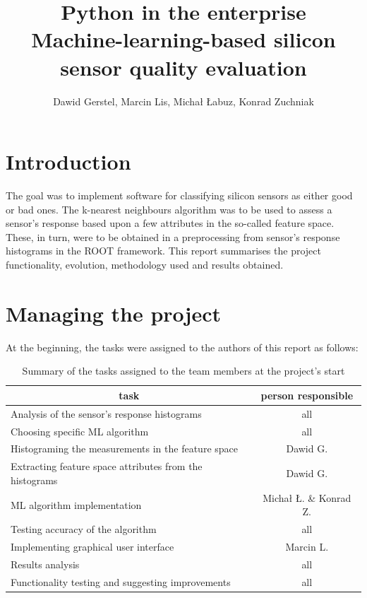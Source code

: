 \documentclass[a4paper,10pt]{article}
\title{\textbf{Python in the enterprise} \\ Machine-learning-based silicon sensor quality evaluation}
\author{Dawid Gerstel, Marcin Lis, Michał Łabuz, Konrad Zuchniak}
\begin{document}
\maketitle



\newpage

\section{Introduction}

The goal was to implement software for classifying silicon sensors as either good or bad ones. The k-nearest neighbours algorithm was to be used to assess a sensor's response 
based upon a few attributes in the so-called feature space. These, in turn, were to be obtained in a preprocessing from sensor's response histograms in the ROOT framework. This report summarises the project functionality, evolution, methodology used and results obtained.

\section{Managing the project}
At the beginning, the tasks were assigned to the authors of this report as follows:

\begin{table}[H]
\centering
\begin{tabular}{@{}lc@{}} \toprule %
\multicolumn{1}{c}{task}& person responsible \\ \toprule
Analysis of the sensor's response histograms & all \\
Choosing specific ML algorithm & all \\
Histograming the measurements in the feature space & Dawid G. \\
Extracting feature space attributes from the histograms & Dawid G. \\
ML algorithm implementation & Michał Ł. \& Konrad Z. \\
Testing accuracy of the algorithm & all \\
Implementing graphical user interface & Marcin L. \\
Results analysis & all \\
Functionality testing and suggesting improvements & all
\bottomrule
\end{tabular}
\caption{Summary of the tasks assigned to the team members at the project's start}
\label{t:tasks}
\end{table}
\end{document}
